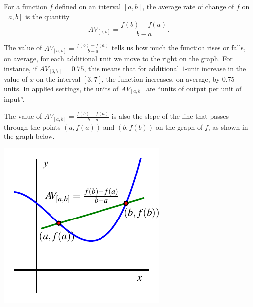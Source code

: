 \documentclass[nooutcomes]{ximera}
\begin{document}
\begin{exploration}
\begin{enumerate}[label=\alph*.]
\end{enumerate}
\end{exploration}

\begin{summary}
\item For a function \(f\) defined on an interval \([a,b]\), the average rate of change of \(f\) on \([a,b]\) is the quantity%
\begin{equation*}
AV_{[a,b]} = \frac{f(b) - f(a)}{b-a}\text{.}
\end{equation*}
\item The value of \(AV_{[a,b]} = \frac{f(b) - f(a)}{b-a}\) tells us how much the function rises or falls, on average, for each additional unit we move to the right on the graph.  For instance, if \(AV_{[3,7]} = 0.75\), this means that for additional \(1\)-unit increase in the value of \(x\) on the interval \([3,7]\), the function increases, on average, by \(0.75\) units.  In applied settings, the units of \(AV_{[a,b]}\) are ``units of output per unit of input''.
\item The value of \(AV_{[a,b]} = \frac{f(b) - f(a)}{b-a}\) is also the slope of the line that passes through the points \((a,f(a))\) and \((b,f(b))\) on the graph of \(f\), as shown in the graph below.
\begin{image}
\includegraphics{aroc-f-x-defn}
\end{image}

\end{summary}
\end{document}
